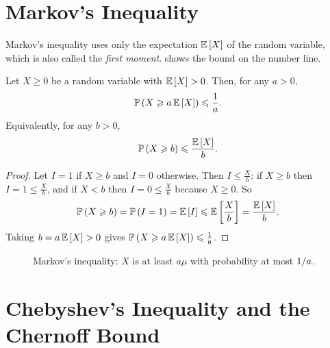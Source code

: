 
\section{Markov's Inequality}

Markov's inequality uses only the expectation $\expectation{X}$ of the random variable, which is
also called the \emph{first moment}.  shows the bound on the number line.

\begin{theorem}\label{thm:markov}
    Let $X \geq 0$ be a random variable with $\expectation{X} > 0$. Then, for any $a > 0$,
    \[\prob{X \geq a \expectation{X}} \leq \frac{1}{a}.\]
    Equivalently, for any $b > 0$,
    \[\prob{X \geq b} \leq \frac{\expectation{X}}{b}.\]
\end{theorem}

\begin{proof}
    Let $I = 1$ if $X \geq b$ and $I = 0$ otherwise. Then $I \leq \frac{X}{b}$: if $X \geq b$ then
    $I = 1 \leq \frac{X}{b}$, and if $X < b$ then $I = 0 \leq \frac{X}{b}$ because $X \geq 0$. So
    \[\prob{X \geq b} = \prob{I = 1} = \expectation{I} \leq \expectation{\frac{X}{b}} = \frac{\expectation{X}}{b}.\]
    Taking $b = a \expectation{X} > 0$ gives $\prob{X \geq a \expectation{X}} \leq \frac{1}{a}$.
\end{proof}

\begin{figure}[ht]
    \centering
    \caption{Markov's inequality: $X$ is at least $a\mu$ with probability at most $1/a$.}
    \label{fig:markov-0903}
\end{figure}

\section{Chebyshev's Inequality and the Chernoff Bound}


